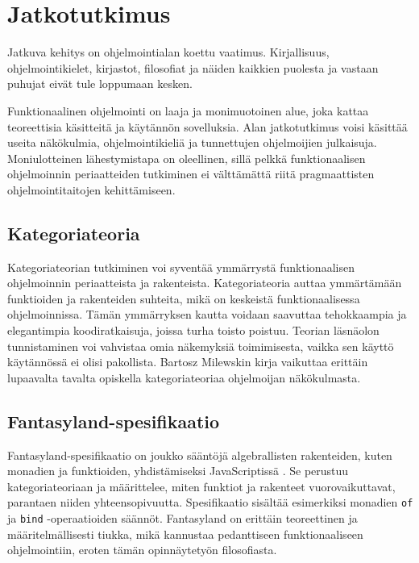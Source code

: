 \section{Jatkotutkimus}

Jatkuva kehitys on ohjelmointialan koettu vaatimus. Kirjallisuus, ohjelmointikielet, kirjastot, filosofiat ja näiden kaikkien puolesta ja vastaan puhujat eivät tule loppumaan kesken.

Funktionaalinen ohjelmointi on laaja ja monimuotoinen alue, joka kattaa teoreettisia käsitteitä ja käytännön sovelluksia. Alan jatkotutkimus voisi käsittää useita näkökulmia, ohjelmointikieliä ja tunnettujen ohjelmoijien julkaisuja. Moniulotteinen lähestymistapa on oleellinen, sillä pelkkä funktionaalisen ohjelmoinnin periaatteiden tutkiminen ei välttämättä riitä pragmaattisten ohjelmointitaitojen kehittämiseen.

\subsection{Kategoriateoria}

Kategoriateorian tutkiminen voi syventää ymmärrystä funktionaalisen ohjelmoinnin periaatteista ja rakenteista. Kategoriateoria auttaa ymmärtämään funktioiden ja rakenteiden suhteita, mikä on keskeistä funktionaalisessa ohjelmoinnissa. Tämän ymmärryksen kautta voidaan saavuttaa tehokkaampia ja elegantimpia koodiratkaisuja, joissa turha toisto poistuu. Teorian läsnäolon tunnistaminen voi vahvistaa omia näkemyksiä toimimisesta, vaikka sen käyttö käytännössä ei olisi pakollista.
Bartosz Milewskin kirja  vaikuttaa erittäin lupaavalta tavalta opiskella kategoriateoriaa ohjelmoijan näkökulmasta.

\subsection{Fantasyland-spesifikaatio}

Fantasyland-spesifikaatio on joukko sääntöjä algebrallisten rakenteiden, kuten monadien ja funktioiden, yhdistämiseksi JavaScriptissä \cite{fantasy-land:contributors}. Se perustuu kategoriateoriaan ja määrittelee, miten funktiot ja rakenteet vuorovaikuttavat, parantaen niiden yhteensopivuutta. Spesifikaatio sisältää esimerkiksi monadien \texttt{of} ja \texttt{bind} -operaatioiden säännöt. Fantasyland on erittäin teoreettinen ja määritelmällisesti tiukka, mikä kannustaa pedanttiseen funktionaaliseen ohjelmointiin, eroten tämän opinnäytetyön filosofiasta.

